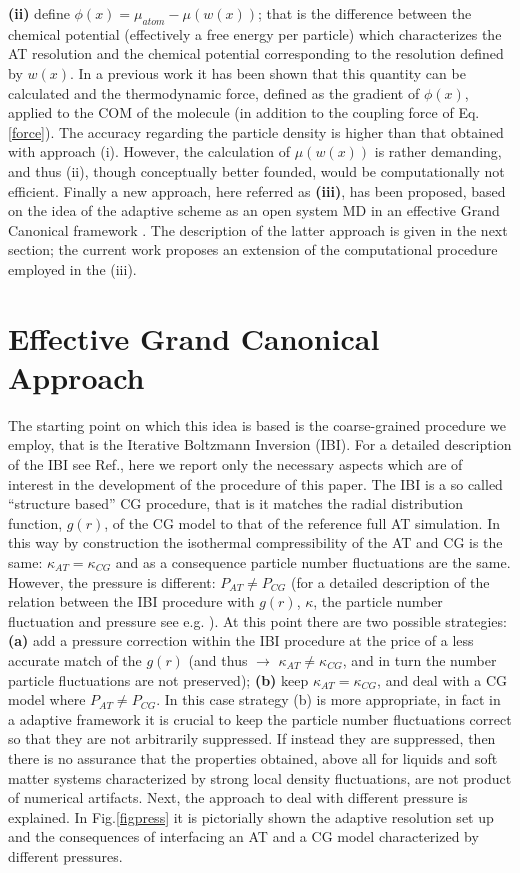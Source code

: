 \documentclass[aps,pre,preprint]{revtex4}
\begin{document}
{\bf (ii)} define $\phi(x)=\mu_{atom}-{\mu}{(w(x))}$; that is the difference between the chemical potential (effectively a free energy per particle) which characterizes the AT resolution and the chemical potential corresponding to the resolution defined by $w(x)$. In a previous work \cite{simon} it has been shown that this quantity can be calculated and the thermodynamic force, defined as the gradient of $\phi(x)$, applied to the COM of the molecule (in addition to the coupling force of Eq.\ref{force}). The accuracy regarding the particle density is higher than that obtained with approach (i). However, the calculation of $\mu(w(x))$ is rather demanding, and thus (ii), though conceptually better founded, would be computationally not efficient. Finally a new approach, here referred as {\bf (iii)}, has been proposed, based on the idea of the adaptive scheme as an open system MD in an effective Grand Canonical framework \cite{prlgc}. The description of the latter approach is given in the next section; the current work proposes an extension of the computational procedure employed in the (iii).

\section{Effective Grand Canonical Approach}
The starting point on which this idea is based is the coarse-grained procedure we employ, that is the Iterative Boltzmann Inversion  (IBI). 
For a detailed description of the IBI see Ref.\cite{ibm}, here we report only the necessary aspects which are of interest in the development of the procedure of this paper.
The IBI is a so called ``structure based'' CG procedure, that is it matches the radial distribution function, $g(r)$, of the CG model to that of the reference full AT simulation. In this way by construction the isothermal compressibility of the AT and CG is the same: $\kappa_{AT}=\kappa_{CG}$ and as a consequence particle number fluctuations are the same. However, the pressure is different: $P_{AT}\neq P_{CG}$  (for a detailed description of the relation between the IBI procedure with $g(r)$, $\kappa$, the particle number fluctuation and pressure see e.g. \cite{han}). At this point there are two possible strategies: {\bf (a)}  add a pressure correction within the IBI procedure at the price of a less accurate match of the $g(r)$ (and thus $\rightarrow$ $\kappa_{AT}\neq\kappa_{CG}$, and in turn the number particle fluctuations are not preserved); {\bf (b)} keep $\kappa_{AT}=\kappa_{CG}$, and deal with a CG model where $P_{AT}\neq P_{CG}$. In this case strategy (b) is more appropriate, in fact in a adaptive framework it is crucial to keep the particle number fluctuations correct so that they are not arbitrarily suppressed. If instead they are suppressed, then there is no assurance that the properties obtained, above all for liquids and soft matter systems characterized by strong local density fluctuations, are not product of numerical artifacts. Next, the approach to deal with different pressure is explained. In Fig.\ref{figpress} it is pictorially shown the adaptive resolution set up and the consequences of interfacing an AT and a CG model characterized by different pressures. 
\end{document}

